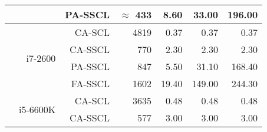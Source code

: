 \begin{table}[htp]
\begin{tabular}{r r r r r r r}
                                          &                                  & PA-SSCL                           & $\approx$ 433                     &  8.60           & 33.00           & 196.00          \\
    \hline
    \multirow{4}{*}{\cite{Leonardon2019}} & \multirow{4}{*}{i7-2600}         & CA-SCL                            &  4819                             &  0.37           &   0.37          &   0.37          \\
                                          &                                  & CA-SSCL                           &   770                             &  2.30           &   2.30          &   2.30          \\
                                          &                                  & PA-SSCL                           &   847                             &  5.50           &  31.10          & 168.40          \\
                                          &                                  & FA-SSCL                           &  1602                             & 19.40           & 149.00          & 244.30          \\
    \hline
    \multirow{4}{*}{\cite{Leonardon2019}} & \multirow{4}{*}{i5-6600K}        & CA-SCL                            &  3635                             &  0.48           &   0.48          &   0.48          \\
                                          &                                  & CA-SSCL                           &   577                             &  3.00           &   3.00          &   3.00          \\

\end{tabular}
\end{table}
